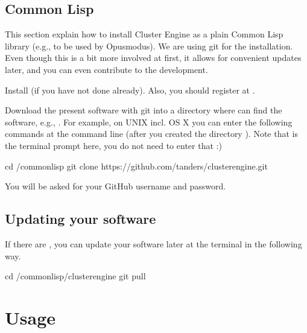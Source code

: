 \documentclass[letterpaper,10pt,english]{sphinxmanual}
\begin{document}
\subsection{Common Lisp}
\label{\detokenize{readme:common-lisp}}
This section explain how to install Cluster Engine as a plain Common Lisp library (e.g., to be used by Opusmodus). We are using git for the installation. Even though this is a bit more involved at first, it allows for convenient updates later, and you can even contribute to the development.

Install  (if you have not done already). Also, you should register at .

Download the present software with git into a directory where  can find the software, e.g., . For example, on UNIX incl. OS X you can enter the following commands at the command line (after you created the directory ). Note that \sphinxcode{\$} is the terminal prompt here, you do not need to enter that :)

\begin{sphinxVerbatim}[commandchars=\\\{\}]
\PYGZdl{} cd \PYGZti{}/common\PYGZhy{}lisp
\PYGZdl{} git clone https://github.com/tanders/cluster\PYGZhy{}engine.git
\end{sphinxVerbatim}

You will be asked for your GitHub username and password.


\subsection{Updating your software}
\label{\detokenize{readme:updating-your-software}}
If there are , you can update your software later at the terminal in the following way.

\begin{sphinxVerbatim}[commandchars=\\\{\}]
\PYGZdl{} cd \PYGZti{}/common\PYGZhy{}lisp/cluster\PYGZhy{}engine
\PYGZdl{} git pull
\end{sphinxVerbatim}


\section{Usage}
\label{\detokenize{readme:usage}}
\end{document}
